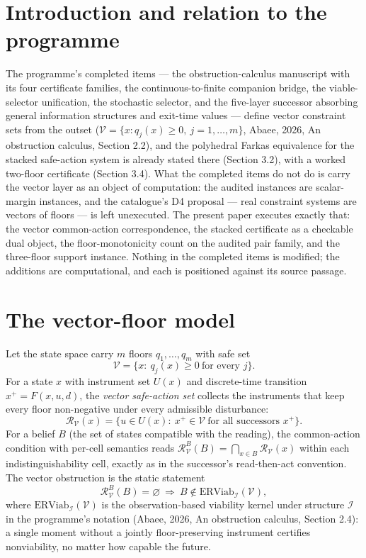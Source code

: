 \documentclass[10pt,twocolumn]{article}
\theoremstyle{definition}
\begin{document}
\section{Introduction and relation to the programme}

The programme's completed items --- the obstruction-calculus manuscript with
its four certificate families, the continuous-to-finite companion bridge,
the viable-selector unification, the stochastic selector, and the five-layer
successor absorbing general information structures and exit-time values ---
define vector
constraint sets from the outset ($\mathcal V=\{x: q_j(x)\ge0,\ j=1,\dots,m\}$,
Abaee, 2026, An obstruction calculus, Section 2.2), and the polyhedral Farkas equivalence for the
stacked safe-action system is already stated there (Section 3.2), with a
worked two-floor certificate (Section 3.4). What the completed items do not
do is carry the vector layer as an object of computation: the audited
instances are scalar-margin instances, and the catalogue's D4 proposal ---
real constraint systems are vectors of floors --- is left unexecuted. The
present paper executes exactly that: the vector common-action
correspondence, the stacked certificate as a checkable dual object, the
floor-monotonicity count on the audited pair family, and the three-floor
support instance. Nothing in the completed items is modified; the additions
are computational, and each is positioned against its source passage.

\section{The vector-floor model}

Let the state space carry $m$ floors $q_1,\dots,q_m$ with safe set
\begin{equation*}
\mathcal V=\{x:\ q_j(x)\ge 0\ \text{for every } j\}.
\end{equation*}
For a state $x$ with instrument set $U(x)$ and discrete-time transition
$x^{+}=F(x,u,d)$, the \emph{vector safe-action set} collects the instruments that keep every floor non-negative under every
admissible disturbance:
\begin{equation*}
\mathcal R_{\mathcal V}(x)=\{u\in U(x):\ x^{+}\in\mathcal V\
\text{for all successors } x^{+}\}.
\end{equation*}
For a belief $B$ (the set of states compatible with the reading), the
common-action condition with per-cell semantics reads
$\mathcal R^B_{\mathcal V}(B)=\bigcap_{x\in B}\mathcal R_{\mathcal V}(x)$
within each indistinguishability cell, exactly as in the successor's
read-then-act convention. The vector obstruction is the static statement
\begin{equation*}
\mathcal R^B_{\mathcal V}(B)=\varnothing\ \Longrightarrow\
B\notin\mathrm{ERViab}_{\mathcal I}(\mathcal V),
\end{equation*}
where $\mathrm{ERViab}_{\mathcal I}(\mathcal V)$ is the observation-based
viability kernel under structure $\mathcal I$ in the programme's notation
(Abaee, 2026, An obstruction calculus, Section 2.4): a single moment without a jointly
floor-preserving instrument certifies nonviability, no matter how capable
the future.
\end{document}
